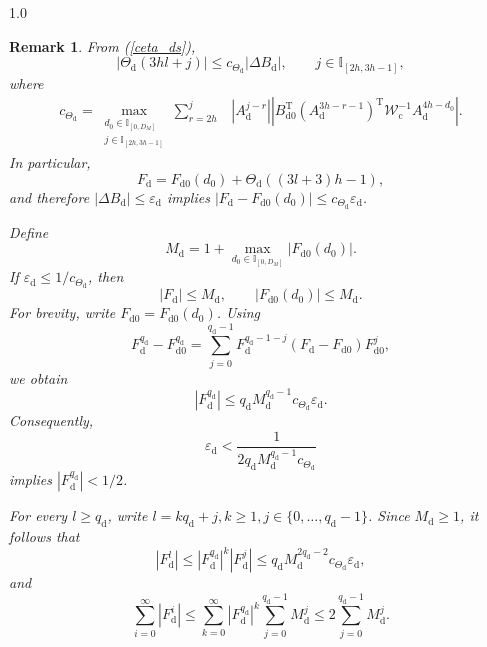 \documentclass[journal]{IEEEtran}
\newtheorem{remark}{Remark}
\begin{document}
\begin{spacing}{1.0}
\begin{remark}
From (\ref{ceta_ds}),
\[
\left|
\mathit{\Theta}_{\mathrm d}(3hl+j)
\right|
\leq
c_{\mathit{\Theta}_{\mathrm d}}
\left|
\mathit{\Delta}B_{\mathrm d}
\right|,
\qquad
j\in\mathbb{I}_{[2h,3h-1]},
\]
where
\[
\begin{aligned}
c_{\mathit{\Theta}_{\mathrm d}}
=
\max_{\substack{
d_{0}\in\mathbb{I}_{[0,D_{M}]}\\
j\in\mathbb{I}_{[2h,3h-1]}
}}
\sum_{r=2h}^{j}
&\left|
A_{\mathrm d}^{j-r}
\right|
\left|
B_{\mathrm d0}^{\mathrm T}
(A_{\mathrm d}^{3h-r-1})^{\mathrm T}
\mathcal{W}_{\mathrm c}^{-1}
A_{\mathrm d}^{4h-d_{0}}
\right|.
\end{aligned}
\]
In particular,
\[
F_{\mathrm d}
=
F_{\mathrm d0}(d_{0})
+
\mathit{\Theta}_{\mathrm d}((3l+3)h-1),
\]
and therefore
$|\mathit{\Delta}B_{\mathrm d}|
\leq\varepsilon_{\mathrm d}$ implies
$\left|
F_{\mathrm d}-F_{\mathrm d0}(d_{0})
\right|
\leq
c_{\mathit{\Theta}_{\mathrm d}}
\varepsilon_{\mathrm d}$.


Define
\[
M_{\mathrm d}
=
1+
\max_{d_{0}\in\mathbb{I}_{[0,D_{M}]}}
\left|
F_{\mathrm d0}(d_{0})
\right|.
\]
If
$\varepsilon_{\mathrm d}
\leq
1/c_{\mathit{\Theta}_{\mathrm d}}$,
then
\[
|F_{\mathrm d}|\leq M_{\mathrm d},
\qquad
|F_{\mathrm d0}(d_{0})|\leq M_{\mathrm d}.
\]
For brevity, write
$F_{\mathrm d0}=F_{\mathrm d0}(d_{0})$. Using
\[
F_{\mathrm d}^{q_{\mathrm d}}
-
F_{\mathrm d0}^{q_{\mathrm d}}
=
\sum_{j=0}^{q_{\mathrm d}-1}
F_{\mathrm d}^{q_{\mathrm d}-1-j}
(F_{\mathrm d}-F_{\mathrm d0})
F_{\mathrm d0}^{j},
\]
we obtain
\[
|F_{\mathrm d}^{q_{\mathrm d}}|
\leq
q_{\mathrm d}
M_{\mathrm d}^{q_{\mathrm d}-1}
c_{\mathit{\Theta}_{\mathrm d}}
\varepsilon_{\mathrm d}.
\]
Consequently,
\[
\varepsilon_{\mathrm d}
<
\frac{1}{
2q_{\mathrm d}
M_{\mathrm d}^{q_{\mathrm d}-1}
c_{\mathit{\Theta}_{\mathrm d}}
}
\]
implies
$|F_{\mathrm d}^{q_{\mathrm d}}|<1/2$.

For every $l\geq q_{\mathrm d}$, write
$l=kq_{\mathrm d}+j,
k\geq1,
j\in\{0,\ldots,q_{\mathrm d}-1\}$.
Since $M_{\mathrm d}\geq1$, it follows that
\[
|F_{\mathrm d}^{l}|
\leq
|F_{\mathrm d}^{q_{\mathrm d}}|^{k}
|F_{\mathrm d}^{j}|
\leq
q_{\mathrm d}
M_{\mathrm d}^{2q_{\mathrm d}-2}
c_{\mathit{\Theta}_{\mathrm d}}
\varepsilon_{\mathrm d},
\]
and
\[
\sum_{i=0}^{\infty}|F_{\mathrm d}^{i}|
\leq
\sum_{k=0}^{\infty}
|F_{\mathrm d}^{q_{\mathrm d}}|^{k}
\sum_{j=0}^{q_{\mathrm d}-1}M_{\mathrm d}^{j}
\leq
2\sum_{j=0}^{q_{\mathrm d}-1}M_{\mathrm d}^{j}.
\]


\end{remark}
\end{spacing}
\end{document}
